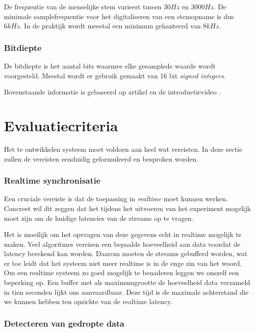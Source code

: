 De frequentie van de menselijke stem varieert tussen $ 30 Hz $ en $ 3000 Hz $. De minimale samplefrequentie voor het digitaliseren van een stemopname is dus $ 6kHz $. In de praktijk wordt meestal een minimum gehanteerd van $ 8kHz $.

\subsubsection{Bitdiepte}

De bitdiepte is het aantal bits waarmee elke gesamplede waarde wordt voorgesteld. Meestal wordt er gebruik gemaakt van 16 bit \textit{signed integers}.

Bovenstaande informatie is gebaseerd op artikel \cite{tarsosmanual2016} en de introductievideo \cite{xiph2016}.

\section{Evaluatiecriteria}
\label{evaluatie-criteria}

Het te ontwikkelen systeem moet voldoen aan heel wat vereisten. In deze sectie zullen de vereisten eenduidig geformuleerd en besproken worden.  

\subsubsection{Realtime synchronisatie}

Een cruciale vereiste is dat de toepassing in \textit{realtime} moet kunnen werken. Concreet wil dit zeggen dat het tijdens het uitvoeren van het experiment mogelijk moet zijn om de huidige latencies van de streams op te vragen.

Het is moeilijk om het opvragen van deze gegevens echt in realtime mogelijk te maken. Veel algoritmes vereisen een bepaalde hoeveelheid aan data voordat de latency berekend kan worden. Daarom moeten de streams gebufferd worden, wat er toe leidt dat het systeem niet meer realtime is in de enge zin van het woord. Om een realtime systeem zo goed mogelijk te benaderen leggen we onszelf een beperking op. Een buffer met als maximumgrootte de hoeveelheid data verzameld in tien seconden lijkt ons aanvaardbaar. Deze tijd is de maximale achterstand die we kunnen hebben ten opzichte van de realtime latency.

\subsubsection{Detecteren van gedropte data}

